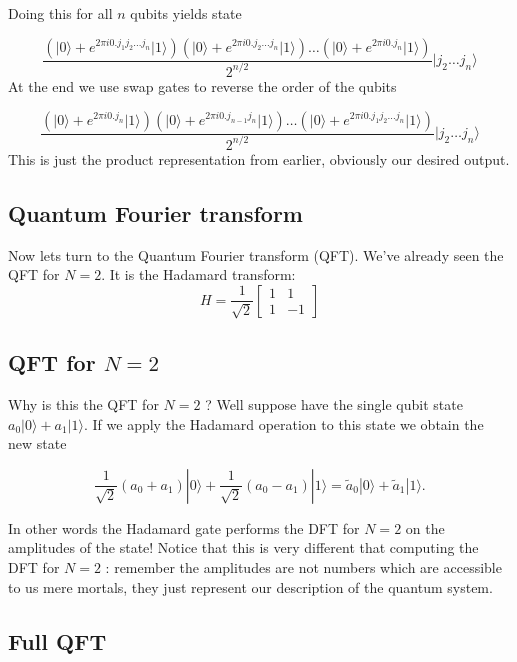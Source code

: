 \documentclass[%
oneside,                 %
final,                   %
10pt]{article}
\begin{document}
Doing this for all $n$ qubits yields state

\[
\frac{\left(\vert 0 \rangle + e^{2\pi i 0.j_1j_2\dots j_n}\vert 1\rangle\right)\left(\vert 0 \rangle + e^{2\pi i 0.j_2\dots j_n}\vert 1\rangle\right)\dots \left(\vert 0 \rangle + e^{2\pi i 0.j_n}\vert 1\rangle\right)}{2^{n/2}} \vert j_2 \dots j_n\rangle
\]
At the end we use swap gates to reverse the order of the qubits

\[
\frac{\left(\vert 0 \rangle + e^{2\pi i 0.j_n}\vert 1\rangle\right)\left(\vert 0 \rangle + e^{2\pi i 0.j_{n-1}j_n}\vert 1\rangle\right)\dots\left(\vert 0 \rangle + e^{2\pi i 0.j_1j_2\dots j_n}\vert 1\rangle\right) }{2^{n/2}} \vert j_2 \dots j_n\rangle
\]
This is just the product representation from earlier, obviously our desired output.

\subsection{Quantum Fourier transform}

Now lets turn to the Quantum Fourier transform (QFT). We've already
seen the QFT for $N=2$. It is the Hadamard transform:
\[
H=\frac{1}{\sqrt{2}}\left[\begin{array}{cc}
1 & 1  \\
1 & -1
\end{array}\right]
\]

\subsection{QFT for $N=2$}

Why is this the QFT for $N=2$ ? Well suppose have the single qubit
state $a_{0}|0\rangle+a_{1}|1\rangle$. If we apply the Hadamard
operation to this state we obtain the new state

\begin{equation*}
\frac{1}{\sqrt{2}}\left(a_{0}+a_{1}\right)|0\rangle+\frac{1}{\sqrt{2}}\left(a_{0}-a_{1}\right)|1\rangle=\tilde{a}_{0}|0\rangle+\tilde{a}_{1}|1\rangle . 
\end{equation*}

In other words the Hadamard gate performs the DFT for $N=2$ on the
amplitudes of the state! Notice that this is very different that
computing the DFT for $N=2$ : remember the amplitudes are not numbers
which are accessible to us mere mortals, they just represent our
description of the quantum system.

\subsection{Full QFT}
\end{document}
